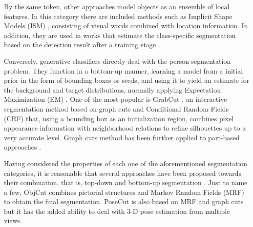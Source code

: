 \documentclass[10pt,twocolumn,letterpaper]{article}
\begin{document}
By the same token, other approaches model objects as an ensemble of local features. In this category there are included methods such as Implicit Shape Models (ISM) \cite{leibe2004combined}, consisting of visual words combined with location information. In addition, they are used in works that estimate the class-specific segmentation based on the detection result after a training stage \cite{leibe2008robust}.  

Conversely, generative classifiers directly deal with the person segmentation problem. They function in a bottom-up manner, learning a model from a initial prior in the form of bounding boxes or seeds, and using it to yield an estimate for the background and target distributions, normally applying Expectation Maximization (EM) \cite{shi2000normalized, carson2002blobworld}. One of the most popular is GrabCut \cite{rother2004grabcut}, an interactive segmentation method based on graph cuts \cite{boykov2001interactive} and Conditional Random Fields (CRF) that, using a bounding box as an initialization region, combines pixel appearance information with neighborhood relations to refine silhouettes up to a very accurate level. Graph cuts method has been further applied to part-based approaches \cite{hernandez2012graph}.
 
Having considered the properties of each one of the aforementioned segmentation categories, it is reasonable that several approaches have been proposed towards their combination, that is, top-down and bottom-up segmentation \cite{lin2007interactive, mori2004recovering, ladicky2010and, levin2006learning}. Just to name a few, ObjCut \cite{kumar2005obj} combines pictorial structures and Markov Random Fields (MRF) to obtain the final segmentation. PoseCut \cite{bray2006posecut} is also based on MRF and graph cuts but it has the added ability to deal with 3-D pose estimation from multiple views.
 
\end{document}
